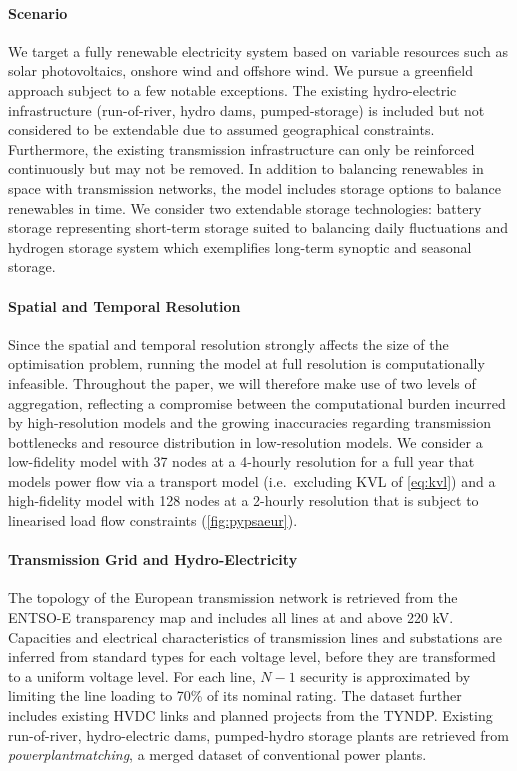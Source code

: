 \paragraph{Scenario}
We target a fully renewable electricity system based on variable resources
such as solar photovoltaics, onshore wind and offshore wind.
We pursue a greenfield approach subject to a few notable exceptions.
The existing hydro-electric infrastructure (run-of-river, hydro dams, pumped-storage)
is included but not considered to be extendable due to assumed geographical constraints.
Furthermore, the existing transmission infrastructure can only
be reinforced continuously but may not be removed.
In addition to balancing renewables in space with transmission networks,
the model includes storage options to balance renewables in time.
We consider two extendable storage technologies:
battery storage representing short-term storage suited to balancing daily fluctuations and
hydrogen storage system which exemplifies long-term synoptic and seasonal storage.

\paragraph{Spatial and Temporal Resolution}
Since the spatial and temporal resolution strongly affects the size of the optimisation problem,
running the model at full resolution is computationally infeasible.
Throughout the paper, we will therefore make use of two levels of aggregation,
reflecting a compromise between the computational burden incurred by high-resolution models and
the growing inaccuracies regarding transmission bottlenecks
and resource distribution in low-resolution models.
We consider a low-fidelity model with 37 nodes at a 4-hourly resolution for a full year
that models power flow via a transport model (i.e.~excluding KVL of \cref{eq:kvl}) and
a high-fidelity model with 128 nodes at a 2-hourly resolution
that is subject to linearised load flow constraints (\cref{fig:pypsaeur}).


\paragraph{Transmission Grid and Hydro-Electricity}
The topology of the European transmission network is retrieved
from the ENTSO-E transparency map and includes all lines at and above 220 kV.
Capacities and electrical characteristics of transmission lines and substations are
inferred from standard types for each voltage level, before they are transformed to
a uniform voltage level.
For each line, $N-1$ security is approximated by limiting the line loading to 70\% of its nominal rating.
The dataset further includes existing HVDC links and planned projects from the TYNDP.
Existing run-of-river, hydro-electric dams, pumped-hydro storage plants
are retrieved from \textit{powerplantmatching}, a merged dataset of conventional power plants.

